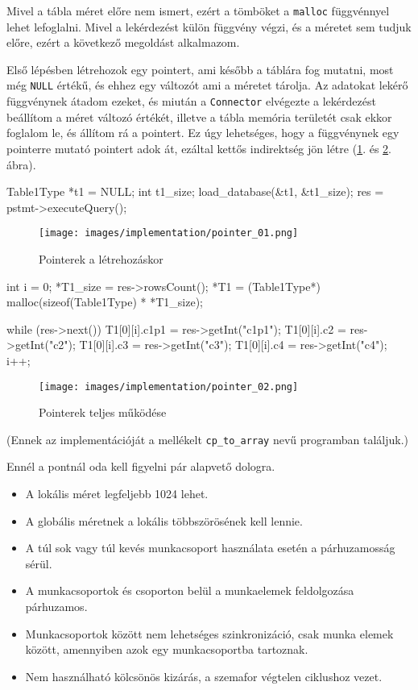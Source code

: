Mivel a tábla méret előre nem ismert, ezért a tömböket a \texttt{malloc} függvénnyel lehet lefoglalni. Mivel a lekérdezést külön függvény végzi, és a méretet sem tudjuk előre, ezért a következő megoldást alkalmazom.

Első lépésben létrehozok egy pointert, ami később a táblára fog mutatni, most még \texttt{NULL} értékű, és ehhez egy változót ami a méretet tárolja. Az adatokat lekérő függvénynek átadom ezeket, és miután a \texttt{Connector} elvégezte a lekérdezést beállítom a méret változó értékét, illetve a tábla memória területét csak ekkor foglalom le, és állítom rá a pointert. Ez úgy lehetséges, hogy a függvénynek egy pointerre mutató pointert adok át, ezáltal kettős indirektség jön létre (\ref{fig:pointer_01}. és \ref{fig:pointer_02}. ábra).

\begin{cpp}
Table1Type *t1 = NULL;
int t1_size;
load_database(&t1, &t1_size);
res = pstmt->executeQuery();
\end{cpp}
\begin{figure}[h!]
\centering
\texttt{[image: images/implementation/pointer\_01.png]}
\caption{Pointerek a létrehozáskor}
\label{fig:pointer_01}
\end{figure}
\begin{cpp}
int i = 0;
*T1_size = res->rowsCount();
*T1 = (Table1Type*) malloc(sizeof(Table1Type) * *T1_size);

while (res->next()) {
    T1[0][i].c1p1 = res->getInt("c1p1");
    T1[0][i].c2 = res->getInt("c2");
    T1[0][i].c3 = res->getInt("c3");
    T1[0][i].c4 = res->getInt("c4");
    i++;
}
\end{cpp}

\begin{figure}[h!]
\centering
\texttt{[image: images/implementation/pointer\_02.png]}
\caption{Pointerek teljes működése}
\label{fig:pointer_02}
\end{figure}

\noindent (Ennek az implementációját a mellékelt \texttt{cp\_to\_array} nevű programban találjuk.)

Ennél a pontnál oda kell figyelni pár alapvető dologra.
\begin{itemize}
\item A lokális méret legfeljebb 1024 lehet.
\item A globális méretnek a lokális többszörösének kell lennie.
\item A túl sok vagy túl kevés munkacsoport használata esetén a párhuzamosság sérül.
\item A munkacsoportok és csoporton belül a munkaelemek feldolgozása párhuzamos.
\item Munkacsoportok között nem lehetséges szinkronizáció, csak munka elemek között, amennyiben azok egy munkacsoportba tartoznak.
\item Nem használható kölcsönös kizárás, a szemafor végtelen ciklushoz vezet.
\end{itemize}

